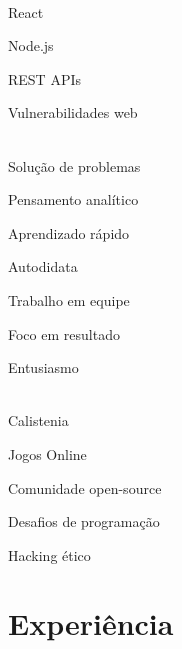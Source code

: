 \documentclass[a4paper]{article}
\begin{document}
\begin{paracol}{2}
\bigskip

 \\[0.5em]

React

Node.js

REST APIs

Vulnerabilidades web

\bigskip

 \\[0.5em]
Solução de problemas

Pensamento analítico

Aprendizado rápido

Autodidata

Trabalho em equipe

Foco em resultado

Entusiasmo

\bigskip

\\[0.5em]

Calistenia

Jogos Online

Comunidade open-source

Desafios de programação

Hacking ético

\bigskip



\switchcolumn

\small
\justify

\vspace{-5em}

\section*{\faBriefcase \; Experiência}


\end{paracol}
\end{document}
